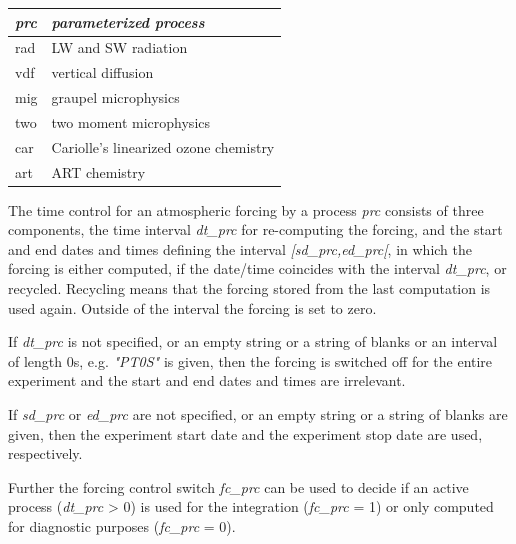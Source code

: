 \begin{table}[htbp]
\begin{center}
\begin{tabular}{l|l}
\textit{prc} & \textit{parameterized process} \\
\hline
rad & LW and SW radiation \\
vdf & vertical diffusion \\
mig & graupel microphysics \\
two & two moment microphysics \\
car & Cariolle's linearized ozone chemistry \\
art & ART chemistry \\
\end{tabular}
\end{center}
\label{default}
\end{table}%

The time control for an atmospheric forcing by a process \textit{prc} consists of
three components, the time interval \textit{dt\_prc} for re-computing the forcing,
and the start and end dates and times defining the interval \textit{[sd\_prc,ed\_prc[},
in which the forcing is either computed, if the date/time coincides with the interval
\textit{dt\_prc}, or recycled. Recycling means that the forcing stored from the last
computation is used again. Outside of the interval the forcing is set to zero.

If \textit{dt\_prc} is not specified, or an empty string or a string of blanks or an
interval of length 0s, e.g. \textit{"PT0S"} is given, then the forcing is switched
off for the entire experiment and the start and end dates and times are irrelevant.

If \textit{sd\_prc} or \textit{ed\_prc} are not specified, or an empty string or a
string of blanks are given, then the experiment start date and the experiment
stop date are used, respectively.

Further the forcing control switch \textit{fc\_prc} can be used to decide if an
active process (\textit{dt\_prc} > 0) is used for the integration
(\textit{fc\_prc} = 1) or only computed for diagnostic purposes (\textit{fc\_prc} = 0).

